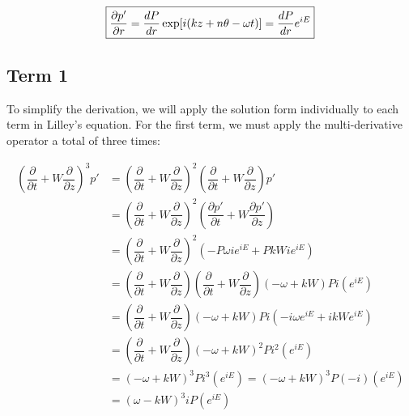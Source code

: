 \documentclass[]{aiaa-tc}%
\begin{document}
\begin{equation} \label{dpdr}
\boxed{\dfrac{\partial p'}{\partial r} = \dfrac{dP}{dr} \exp[i(kz + n\theta -\omega t)] = \dfrac{dP}{dr} e^{iE} }
\end{equation}



\subsection{Term 1}

To simplify the derivation, we will apply the solution form individually to each term in Lilley's equation.  For the first term, we must apply the multi-derivative operator a total of three times:



\begin{align*}
\left( \dfrac{\partial}{\partial t} + W \dfrac{\partial}{\partial z} \right)^3 p'
&= \left( \dfrac{\partial}{\partial t} + W \dfrac{\partial}{\partial z}
   \right)^2
   \left( \dfrac{\partial}{\partial t} + W \dfrac{\partial}{\partial z}
   \right)p' \\
&= \left( \dfrac{\partial}{\partial t} + W \dfrac{\partial}{\partial z}
   \right)^2
   \left( \dfrac{\partial p'}{\partial t} + W \dfrac{\partial p'}{\partial z}
   \right) \\
&= \left( \dfrac{\partial}{\partial t} + W \dfrac{\partial}{\partial z}
   \right)^2
   \left( -P\omega ie^{iE} + PkW ie^{iE}
   \right) \\
&= \left( \dfrac{\partial}{\partial t} + W \dfrac{\partial}{\partial z}
   \right)
   \left( \dfrac{\partial}{\partial t} + W \dfrac{\partial}{\partial z}
   \right) (-\omega + kW)P i (e^{iE}) \\
&= \left( \dfrac{\partial}{\partial t} + W \dfrac{\partial}{\partial z}
   \right) (-\omega + kW)P i
   (-i\omega e^{iE} + ikW e^{iE}) \\
&= \left( \dfrac{\partial}{\partial t} + W \dfrac{\partial}{\partial z}
   \right) (-\omega + kW)^2 P i^2 (e^{iE}) \\
&= (-\omega + kW)^3 P i^3(e^{iE}) = (-\omega + kW)^3P(-i) (e^{iE}) \\
&= (\omega - kW)^3iP (e^{iE})
\end{align*}
\end{document}
